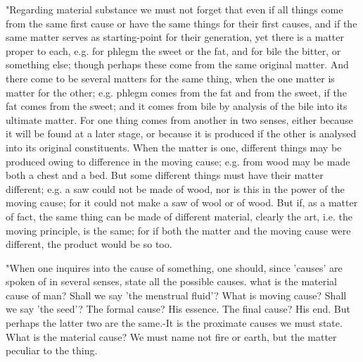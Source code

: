 "Regarding material substance we must not forget that even if all
things come from the same first cause or have the same things for
their first causes, and if the same matter serves as starting-point
for their generation, yet there is a matter proper to each, e.g. for
phlegm the sweet or the fat, and for bile the bitter, or something
else; though perhaps these come from the same original matter. And
there come to be several matters for the same thing, when the one
matter is matter for the other; e.g. phlegm comes from the fat and
from the sweet, if the fat comes from the sweet; and it comes from
bile by analysis of the bile into its ultimate matter. For one thing
comes from another in two senses, either because it will be found
at a later stage, or because it is produced if the other is analysed
into its original constituents. When the matter is one, different
things may be produced owing to difference in the moving cause; e.g.
from wood may be made both a chest and a bed. But some different things
must have their matter different; e.g. a saw could not be made of
wood, nor is this in the power of the moving cause; for it could not
make a saw of wool or of wood. But if, as a matter of fact, the same
thing can be made of different material, clearly the art, i.e. the
moving principle, is the same; for if both the matter and the moving
cause were different, the product would be so too. 

"When one inquires into the cause of something, one should, since
'causes' are spoken of in several senses, state all the possible causes.
what is the material cause of man? Shall we say 'the menstrual fluid'?
What is moving cause? Shall we say 'the seed'? The formal cause? His
essence. The final cause? His end. But perhaps the latter two are
the same.-It is the proximate causes we must state. What is the material
cause? We must name not fire or earth, but the matter peculiar to
the thing. 


